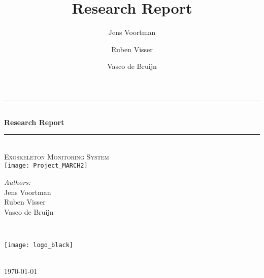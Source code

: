 \documentclass [a4paper,11pt]{article}
\title{Research Report}
\author{Jens Voortman \and Ruben Visser \and Vasco de Bruijn}
\begin{document}
\begin{titlepage}

\newcommand{\HRule}{\rule{\linewidth}{0.5mm}}
\centering

\HRule \\[0.4cm]
{ \huge \bfseries Research Report}\\ %
\HRule \\[0.4cm]

\textsc{\large Exoskeleton Monitoring System}\\[1.4cm]

\texttt{[image: Project\_MARCH2]}\\[1.4cm]


\begin{minipage}{0.4\textwidth}
\begin{flushleft} \large
\emph{Authors:}\\
Jens Voortman\\
Ruben Visser\\
Vasco de Bruijn
\end{flushleft}
\end{minipage}
~
\begin{minipage}{0.4\textwidth}
\begin{flushright} \large
\texttt{[image: logo\_black]}
\end{flushright}
\end{minipage}\\[2cm]

{\large \today}\\

\vfill
\end{titlepage}

\pagebreak
\tableofcontents
\pagebreak



\pagebreak

\pagebreak

\pagebreak

\pagebreak

\pagebreak

\pagebreak

\pagebreak

\pagebreak

\pagebreak

\appendix

\end{document}
